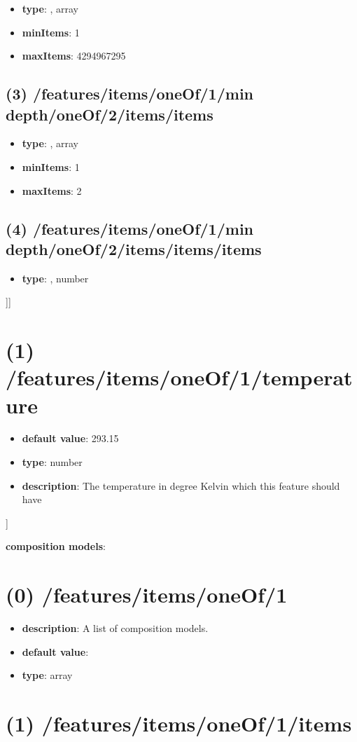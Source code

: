 \begin{itemize}[leftmargin=2em]\item {\bf type}: , array\item {\bf minItems}: 1
\item {\bf maxItems}: 4294967295
\end{itemize}\subsection{(3) /features/items/oneOf/1/min depth/oneOf/2/items/items}
\begin{itemize}[leftmargin=3em]\item {\bf type}: , array\item {\bf minItems}: 1
\item {\bf maxItems}: 2
\end{itemize}\subsection{(4) /features/items/oneOf/1/min depth/oneOf/2/items/items/items}
\begin{itemize}[leftmargin=4em]\item {\bf type}: , number\end{itemize}]]\section{(1) /features/items/oneOf/1/temperature}
\begin{itemize}[leftmargin=1em]\item {\bf default value}: 293.15
\item {\bf type}: number
\item {\bf description}: The temperature in degree Kelvin which this feature should have
\end{itemize}]\item {\bf composition models}: \section{(0) /features/items/oneOf/1}
\begin{itemize}[leftmargin=0em]\item {\bf description}: A list of composition models.
\item {\bf default value}: 
\item {\bf type}: array
\end{itemize}\section{(1) /features/items/oneOf/1/items}

